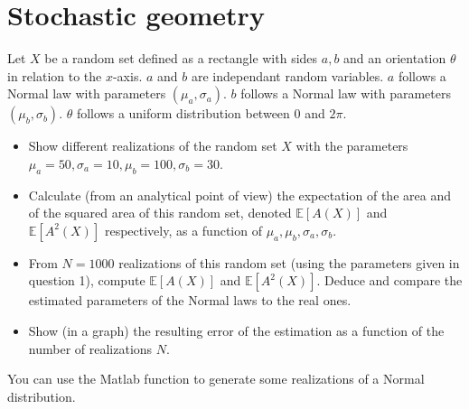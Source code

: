 \section{Stochastic geometry}

Let $X$ be a random set defined as a rectangle with sides $a, b$ and an orientation $\theta$ in relation to the $x$-axis. $a$ and $b$ are independant random variables. $a$ follows a Normal law with parameters $(\mu_a,\sigma_a)$. $b$ follows a Normal law with parameters $(\mu_b,\sigma_b)$.  $\theta$ follows a uniform distribution between $0$ and $2\pi$.

\begin{qbox}
\begin{itemize}
\item Show different realizations of the random set $X$ with the parameters $\mu_a=50, \sigma_a=10,\mu_b=100,\sigma_b=30$.
\item Calculate (from an analytical point of view) the expectation of the area and of the squared area of this random set, denoted $\mathbb{E}[A(X)]$ and $\mathbb{E}[A^2(X)]$ respectively, as a function of $\mu_a,\mu_b,\sigma_a,\sigma_b$.
\item From $N=1000$ realizations of this random set (using the parameters given in question 1), compute $\mathbb{E}[A(X)]$ and $\mathbb{E}[A^2(X)]$. Deduce and compare the estimated parameters of the Normal laws to the real ones.
\item Show (in a graph) the resulting error of the estimation as a function of the number of realizations $N$. 
\end{itemize}
\end{qbox}

\begin{mcomment}
\begin{mremark}
You can use the Matlab function  to generate some realizations of a Normal distribution.
\end{mremark}
\end{mcomment}
